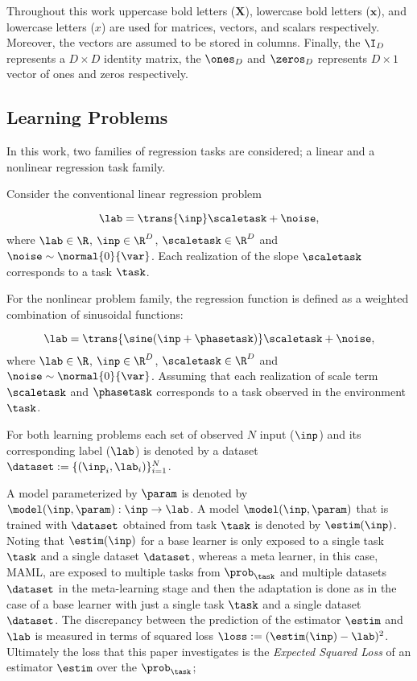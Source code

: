 Throughout this work uppercase bold letters (\eg $\mathbf{X}$), lowercase bold letters (\eg $\mathbf{x}$), and lowercase letters (\eg ${x}$) are used for matrices, vectors, and scalars respectively. Moreover, the vectors are assumed to be stored in columns. Finally, the $\I_{D}$ represents a $D\times D$ identity matrix, the $\ones_{D}$ and $\zeros_{D}$ represents $D\times 1$ vector of ones and zeros respectively.

\subsection{Learning Problems}

In this work, two families of regression tasks are considered; a linear and a nonlinear regression task family.


Consider the conventional linear regression problem

\begin{equation}\label{eq:linearreg}
  \lab = \trans{\inp}\scaletask+\noise, 
\end{equation}
where $\lab\in\R$, $\inp\in\R^D$, $\scaletask\in\R^D$ and $\noise\sim\normal{0}{\var}$. Each realization of the slope $\scaletask$ corresponds to a task $\task$.%

For the nonlinear problem family, the regression function is defined as a weighted combination of sinusoidal functions:

\begin{equation}\label{eq:nonlinearreg}
  \lab = \trans{\sine(\inp+\phasetask)}\scaletask+\noise, 
\end{equation}
where $\lab\in\R$, $\inp\in\R^D$, $\scaletask\in\R^D$ and $\noise\sim\normal{0}{\var}$. Assuming that each realization of scale term $\scaletask$ and $\phasetask$ corresponds to a task observed in the environment $\task$. 

For both learning problems each set of observed $N$ input ($\inp$) and its corresponding label ($\lab$) is denoted by a dataset $\dataset:=\{(\inp_i, \lab_i)\}_{i=1}^{N}$.

A model parameterized by $\param$ is denoted by $\model(\inp, \param):\inp\to\lab$. A model $\model(\inp, \param)$ that is trained with $\dataset$ obtained from  task $\task$ is denoted by $\estim(\inp)$. Noting that $\estim(\inp)$ for a base learner is only exposed to a single task $\task$ and a single dataset $\dataset$, whereas a meta learner, in this case, MAML, are exposed to multiple tasks from $\prob_\task$ and multiple datasets $\dataset$ in the meta-learning stage and then the adaptation is done as in the case of a base learner with just a single task $\task$ and a single dataset $\dataset$.  The discrepancy between the prediction of the estimator $\estim$ and $\lab$ is measured in terms of squared loss $\loss:=(\estim(\inp)-\lab)^2$. Ultimately the loss that this paper investigates is the \textit{Expected Squared Loss} of an estimator $\estim$ over the $\prob_{\task}$;

